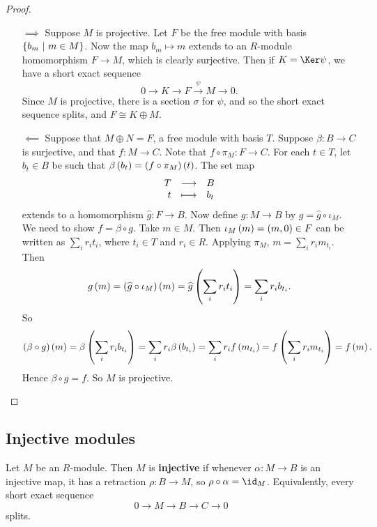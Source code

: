 \begin{proof}
\hfill
\begin{itemize}
\item[$ \implies $] Suppose $ M $ is projective. Let $ F $ be the free module with basis $ \cbr{b_m \st m \in M} $. Now the map $ b_m \mapsto m $ extends to an $ R $-module homomorphism $ F \to M $, which is clearly surjective. Then if $ K = \Ker \psi $, we have a short exact sequence
$$ 0 \to K \to F \xrightarrow{\psi} M \to 0. $$
Since $ M $ is projective, there is a section $ \sigma $ for $ \psi $, and so the short exact sequence splits, and $ F \cong K \oplus M $.


\item[$ \impliedby $] Suppose that $ M \oplus N = F $, a free module with basis $ T $. Suppose $ \beta : B \to C $ is surjective, and that $ f : M \to C $. Note that $ f \circ \pi_M : F \to C $. For each $ t \in T $, let $ b_t \in B $ be such that $ \beta\br{b_t} = \br{f \circ \pi_M}\br{t} $. The set map
$$ \function{T}{B}{t}{b_t} $$
extends to a homomorphism $ \widehat{g} : F \to B $. Now define $ g : M \to B $ by $ g = \widehat{g} \circ \iota_M $. We need to show $ f = \beta \circ g $. Take $ m \in M $. Then $ \iota_M\br{m} = \br{m, 0} \in F $ can be written as $ \sum_i r_it_i $, where $ t_i \in T $ and $ r_i \in R $. Applying $ \pi_M $, $ m = \sum_i r_im_{t_i} $. Then
$$ g\br{m} = \br{\widehat{g} \circ \iota_M}\br{m} = \widehat{g}\br{\sum_i r_it_i} = \sum_i r_ib_{t_i}. $$
So
$$ \br{\beta \circ g}\br{m} = \beta\br{\sum_i r_ib_{t_i}} = \sum_i r_i\beta\br{b_{t_i}} = \sum_i r_if\br{m_{t_i}} = f\br{\sum_i r_im_{t_i}} = f\br{m}. $$
Hence $ \beta \circ g = f $. So $ M $ is projective.
\end{itemize}
\end{proof}

\pagebreak

\subsection{Injective modules}

\begin{definition}
Let $ M $ be an $ R $-module. Then $ M $ is \textbf{injective} if whenever $ \alpha : M \to B $ is an injective map, it has a retraction $ \rho : B \to M $, so $ \rho \circ \alpha = \id_M $. Equivalently, every short exact sequence
$$ 0 \to M \to B \to C \to 0 $$
splits.
\end{definition}

